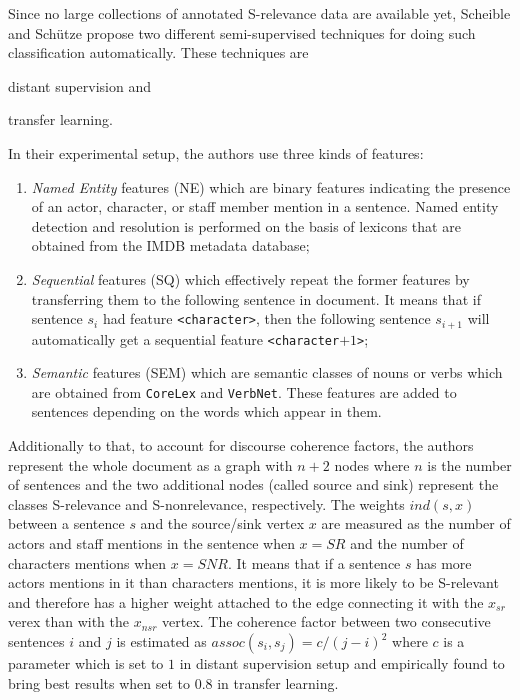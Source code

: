 \documentclass[a4paper,11pt]{article}
\begin{document}
Since no large collections of annotated S-relevance data are available
yet, Scheible and Sch\"utze propose two different semi-supervised
techniques for doing such classification automatically.  These
techniques are
\begin{inparaenum}
  \item distant supervision and
  \item transfer learning.
\end{inparaenum} In their experimental setup, the authors use three kinds of features:
\begin{enumerate}
  \item \textit{Named Entity} features (NE) which are binary features
    indicating the presence of an actor, character, or staff member
    mention in a sentence.  Named entity detection and resolution is
    performed on the basis of lexicons that are obtained from the IMDB
    metadata database;\label{li-ne-feat}
  \item \textit{Sequential} features (SQ) which effectively repeat the
    former features by transferring them to the following sentence in
    document.  It means that if sentence $s_i$ had feature
    \texttt{<character>}, then the following sentence $s_{i+1}$ will
    automatically get a sequential feature \texttt{<character$+1$>};
  \item \textit{Semantic} features (SEM) which are semantic classes of
    nouns or verbs which are obtained from \texttt{CoreLex} and
    \texttt{VerbNet}.  These features are added to sentences depending
    on the words which appear in them.
\end{enumerate}
Additionally to that, to account for discourse coherence factors, the
authors represent the whole document as a graph with $n + 2$ nodes
where $n$ is the number of sentences and the two additional nodes
(called source and sink) represent the classes S-relevance and
S-nonrelevance, respectively.  The weights $ind(s, x)$ between a
sentence $s$ and the source/sink vertex $x$ are measured as the number
of actors and staff mentions in the sentence when $x = SR$ and the
number of characters mentions when $x = SNR$.  It means that if a
sentence $s$ has more actors mentions in it than characters mentions,
it is more likely to be S-relevant and therefore has a higher weight
attached to the edge connecting it with the $x_{sr}$ verex than with
the $x_{nsr}$ vertex.  The coherence factor between two consecutive
sentences $i$ and $j$ is estimated as $assoc(s_i, s_j) = c / (j -
i)^2$ where $c$ is a parameter which is set to $1$ in distant
supervision setup and empirically found to bring best results when set
to $0.8$ in transfer learning.
\end{document}

